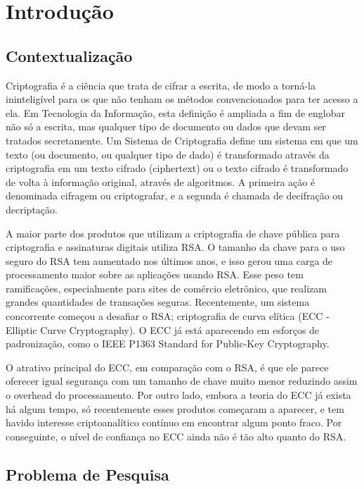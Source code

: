 \chapter*[Introdução]{Introdução}

\section*{Contextualização}
Criptografia é a ciência que trata de cifrar a escrita, de modo a torná-la ininteligível para os que não tenham os métodos convencionados para ter acesso a ela. Em Tecnologia da Informação, esta definição é ampliada a fim de englobar não só a escrita, mas qualquer tipo de documento ou dados que devam ser tratados secretamente. Um Sistema de Criptografia define um sistema em que um texto (ou documento, ou qualquer tipo de dado) é transformado através da criptografia em um texto cifrado (ciphertext) ou o texto cifrado é transformado de volta à informação original, através de algoritmos. A primeira ação é denominada cifragem ou criptografar, e a segunda é chamada de decifração ou decriptação. \cite{Portnoi:2005} 

A maior parte dos produtos que utilizam a criptografia de chave pública para criptografia e assinaturas digitais utiliza RSA. O tamanho da chave para o uso seguro do RSA tem aumentado nos últimos anos, e isso gerou uma carga de processamento maior sobre as aplicações usando RSA. Esse peso tem ramificações, especialmente para sites de comércio eletrônico, que realizam grandes quantidades de transações seguras. Recentemente, um sistema concorrente começou a desafiar o RSA; criptografia de curva elítica (ECC - Elliptic Curve Cryptography). O ECC já está aparecendo em esforços de padronização, como o IEEE P1363 Standard for Public-Key Cryptography. \cite{Lee:2011}

O atrativo principal do ECC, em comparação com o RSA, é que ele parece oferecer igual segurança com um tamanho de chave muito menor reduzindo assim o overhead do processamento. Por outro lado, embora a teoria do ECC já exista há algum tempo, só recentemente esses produtos começaram a aparecer, e tem havido interesse criptoanalítico contínuo em encontrar algum ponto fraco. Por conseguinte, o nível de confiança no ECC ainda não é tão alto quanto do RSA. \cite{Stallings:2011}

\section*{Problema de Pesquisa}

